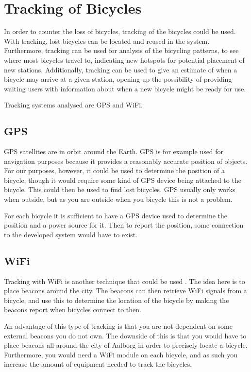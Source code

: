 \section{Tracking of Bicycles}
In order to counter the loss of bicycles, tracking of the bicycles could be used.
With tracking, lost bicycles can be located and reused in the system.
Furthermore, tracking can be used for analysis of the bicycling patterns, to see where most bicycles travel to, indicating new hotspots for potential placement of new stations.
Additionally, tracking can be used to give an estimate of when a bicycle may arrive at a given station, opening up the possibility of providing waiting users with information about when a new bicycle might be ready for use.

Tracking systems analysed are GPS and WiFi.

\subsection{GPS}
GPS satellites are in orbit around the Earth.
GPS is for example used for navigation purposes because it provides a reasonably accurate position of objects.
For our purposes, however, it could be used to determine the position of a bicycle, though it would require some kind of GPS device being attached to the bicycle.
This could then be used to find lost bicycles.
GPS usually only works when outside, but as you are outside when you bicycle this is not a problem\citep{misc:howgpsworks}.

For each bicycle it is sufficient to have a GPS device used to determine the position and a power source for it.
Then to report the position, some connection to the developed system would have to exist.

\subsection{WiFi}
Tracking with WiFi is another technique that could be used \citep{article:wifitracking}.
The idea here is to place beacons around the city.
The beacons can then retrieve WiFi signals from a bicycle, and use this to determine the location of the bicycle by making the beacons report when bicycles connect to then.

An advantage of this type of tracking is that you are not dependent on some external beacons you do not own.
The downside of this is that you would have to place beacons all around the city of Aalborg in order to precisely locate a bicycle.
Furthermore, you would need a WiFi module on each bicycle, and as such you increase the amount of equipment needed to track the bicycles.

